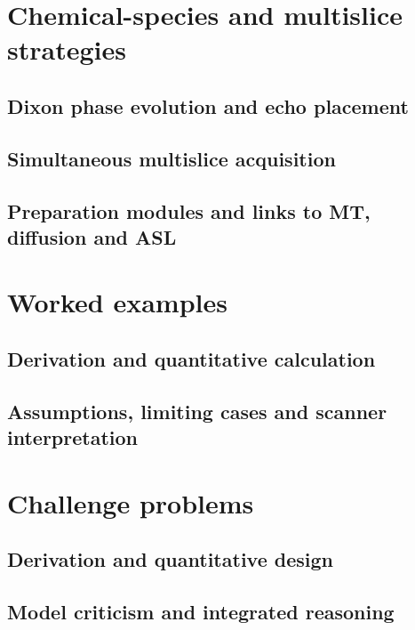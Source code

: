 \section{Chemical-species and multislice strategies}
\label{sec:08:chemical-species-and-multislice-strategies}
\subsection{Dixon phase evolution and echo placement}
\subsection{Simultaneous multislice acquisition}
\subsection{Preparation modules and links to MT, diffusion and ASL}

\section{Worked examples}
\label{sec:08:worked-examples}
\subsection{Derivation and quantitative calculation}
\subsection{Assumptions, limiting cases and scanner interpretation}

\section{Challenge problems}
\label{sec:08:challenge-problems}
\subsection{Derivation and quantitative design}
\subsection{Model criticism and integrated reasoning}
